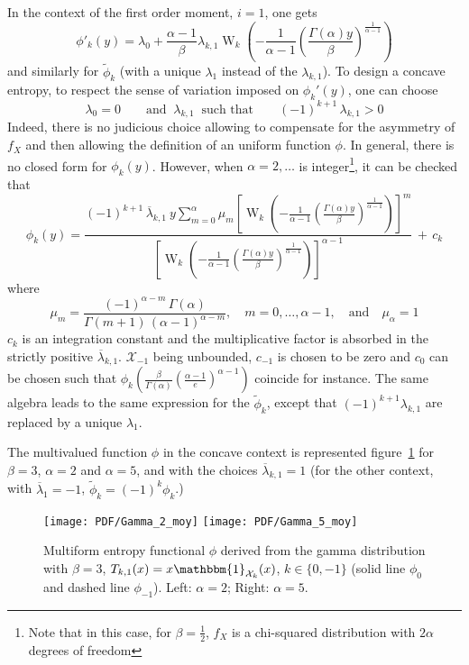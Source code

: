 \documentclass[english,onecolumn]{elsarticle}
\def\X{\mathcal{X}}
\def\un{\mathbbm{1}}
\def\W{\operatorname{W}}
\begin{document}
In the context of the first order moment, $i = 1$, one gets
%
\[
\phi'_k(y) = \lambda_0 + \frac{\alpha-1}{\beta} \lambda_{k,1} \W_k \left( -
\frac{1}{\alpha-1} \left( \frac{\Gamma(\alpha) y}{\beta}
\right)^{\frac{1}{\alpha-1}} \right)
\]
%
and similarly  for $\widetilde{\phi}_k$ (with  a unique $\lambda_1$  instead of
the  $\lambda_{k,1}$). To  design a  concave entropy,  to respect  the  sense of
variation imposed on $\phi_k'(y)$, one can choose
%
\[
\lambda_0 = 0 \qquad \mbox{and } \: \lambda_{k,1} \: \mbox{ such that} \qquad
(-1)^{k+1} \, \lambda_{k,1} > 0
\]
%
Indeed, there is  no judicious choice allowing to  compensate for the asymmetry
of $f_X$  and then  allowing the  definition of an  uniform function  $\phi$. In
general,  there is  no  closed form  for  $\phi_k(y)$. However,  when $\alpha  =
2,\ldots$ is  integer\footnote{Note that  in this case,  for $\beta  = \frac12$,
  $f_X$ is  a chi-squared distribution with  $2 \alpha$ degrees  of freedom}, it
can be checked that
%
\[
\phi_k(y) = \frac{\displaystyle (-1)^{k+1} \, \overline{\lambda}_{k,1} \: y
\sum_{m=0}^\alpha \mu_m \left[\W_k\left(- \frac{1}{\alpha-1} \left(
\frac{\Gamma(\alpha) y}{\beta} \right)^{\frac{1}{\alpha-1}} \right)
\right]^m}{\left[\W_k\left(- \frac{1}{\alpha-1} \left( \frac{\Gamma(\alpha)
y}{\beta} \right)^{\frac{1}{\alpha-1}} \right) \right]^{\alpha-1}} \, + \, c_k
\]
%
where
%
\[
\mu_m = \frac{(-1)^{\alpha-m} \, \Gamma(\alpha)}{\Gamma(m+1) \,
(\alpha-1)^{\alpha-m}}, \quad m = 0, \ldots, \alpha-1, \quad \mbox{and} \quad
\mu_\alpha = 1
\]
%
$c_k$ is  an integration constant and  the multiplicative factor  is absorbed in
the  strictly positive  $\overline{\lambda}_{k,1}$.  $\X_{-1}$ being  unbounded,
$c_{-1}$ is  chosen to be zero and  $c_0$ can be chosen  such that $\phi_k\left(
  \frac{\beta}{\Gamma(\alpha)}   \left(   \frac{\alpha-1}{e}  \right)^{\alpha-1}
\right)$ coincide  for instance. The same  algebra leads to  the same expression
for  the  $\widetilde{\phi}_k$,   except  that  $(-1)^{k+1}  \lambda_{k,1}$  are
replaced by a unique $\lambda_1$.

The  multivalued   function  $\phi$  in  the  concave   context  is  represented
figure~\ref{fig:Entropy-gamma-moy} for $\beta  = 3$, $\alpha = 2$  and $\alpha =
5$, and with the choices  $\overline{\lambda}_{k,1} = 1$ (for the other context,
with $\overline{\lambda}_1 = -1$, $\widetilde{\phi}_k = (-1)^k \phi_k$.)
%
\begin{figure}[htbp]
\centerline{
\texttt{[image: PDF/Gamma\_2\_moy]} \hspace{2mm}
\texttt{[image: PDF/Gamma\_5\_moy]}}
%
\caption{Multiform entropy functional $\phi$ derived from the gamma distribution
  with $\beta = 3$,  $T_{k,1}(x) = x \un_{\X_k}(x)$, $k \in \{0  , -1 \}$ (solid
  line $\phi_0$ and dashed line $\phi_{-1}$). Left: $\alpha = 2$; Right: $\alpha
  = 5$.}
\label{fig:Entropy-gamma-moy}
\end{figure}
%
\end{document}
